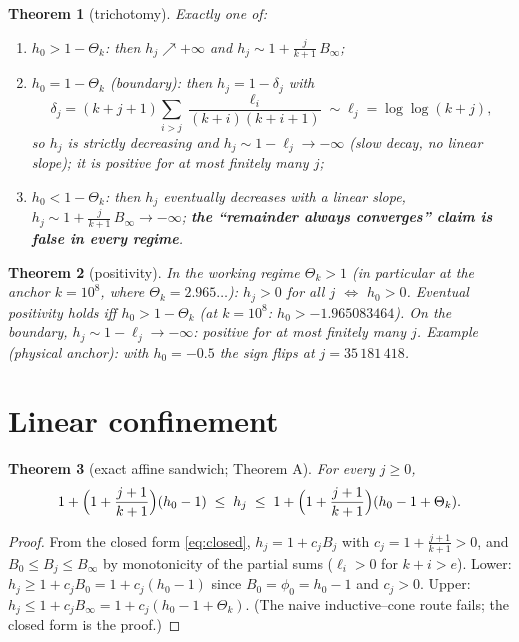 \documentclass[11pt]{article}
\newtheorem{theorem}{Theorem}[section]
\theoremstyle{remark}
\begin{document}
\begin{theorem}[trichotomy]\label{thm:tri}
Exactly one of:
\begin{enumerate}
\item $h_0>1-\Theta_k$: then $h_j\nearrow+\infty$ and
$h_j\sim1+\frac{j}{k+1}\,B_\infty$;
\item $h_0=1-\Theta_k$ (boundary): then $h_j=1-\delta_j$ with
\[
\delta_j=(k+j+1)\!\!\sum_{i>j}\frac{\ell_i}{(k+i)(k+i+1)}\sim\ell_j=\log\log(k+j),
\]
so $h_j$ is strictly decreasing and $h_j\sim1-\ell_j\to-\infty$ (slow decay, no
linear slope); it is positive for at most finitely many $j$;
\item $h_0<1-\Theta_k$: then $h_j$ eventually decreases with a linear slope,
$h_j\sim1+\frac{j}{k+1}\,B_\infty\to-\infty$; \textbf{the ``remainder always
converges'' claim is false in every regime}.
\end{enumerate}
\end{theorem}

\begin{theorem}[positivity]\label{thm:hpos}
In the working regime $\Theta_k>1$ (in particular at the anchor $k=10^8$,
where $\Theta_k=2.965\dots$): $h_j>0$ for all $j$ $\iff$ $h_0>0$. Eventual
positivity holds iff $h_0>1-\Theta_k$ (at $k=10^8$: $h_0>-1.965083464$). On
the boundary, $h_j\sim1-\ell_j\to-\infty$: positive for at most finitely many
$j$. Example (physical anchor): with $h_0=-0.5$ the sign flips at
$j=35\,181\,418$.
\end{theorem}

\section{Linear confinement}\label{sec:confinement}

\begin{theorem}[exact affine sandwich; Theorem A]\label{thm:sandwich}
For every $j\ge0$,
\[
1+\Bigl(1+\frac{j+1}{k+1}\Bigr)(h_0-1)
\;\le\; h_j\;\le\;
1+\Bigl(1+\frac{j+1}{k+1}\Bigr)(h_0-1+\Theta_k).
\]
\end{theorem}

\begin{proof}
From the closed form \eqref{eq:closed}, $h_j=1+c_jB_j$ with
$c_j=1+\frac{j+1}{k+1}>0$, and $B_0\le B_j\le B_\infty$ by monotonicity of the
partial sums ($\ell_i>0$ for $k+i>e$). Lower: $h_j\ge1+c_jB_0=1+c_j(h_0-1)$
since $B_0=\phi_0=h_0-1$ and $c_j>0$. Upper:
$h_j\le1+c_jB_\infty=1+c_j(h_0-1+\Theta_k)$.
(The naive inductive--cone route fails; the closed form is the proof.)
\end{proof}
\end{document}
